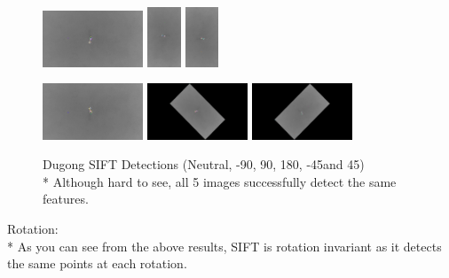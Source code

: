 \documentclass[conference]{IEEEtran}
\begin{document}
\clearpage
\begin{figure}[H]
    \centerline{
        {\includegraphics[width=30mm, scale=0.5]{./figures/SIFT/DugongNeutral SIFT.png}}
        {\includegraphics[width=10mm, scale=0.5]{./figures/SIFT/DugongDeg 90 SIFT.png}}
        {\includegraphics[width=10mm, scale=0.5]{./figures/SIFT/DugongDeg -90 SIFT.png}}
    }
    \centerline{
        {\includegraphics[width=30mm, scale=0.5]{./figures/SIFT/Dugong180 Deg SIFT.png}}
        {\includegraphics[width=30mm, scale=0.5]{./figures/SIFT/DugongDeg -45 SIFT.png}}
        {\includegraphics[width=30mm, scale=0.5]{./figures/SIFT/DugongDeg 45 SIFT.png}}
    }
    \caption{Dugong SIFT Detections (Neutral, -90\degree, 90\degree, 180\degree, -45\degree and 45\degree)\\*
    Although hard to see, all 5 images successfully detect the same features.}
    \label{fig}
\end{figure}
Rotation: \\*
As you can see from the above results, SIFT is rotation invariant as it detects the same points at each rotation.
\end{document}
